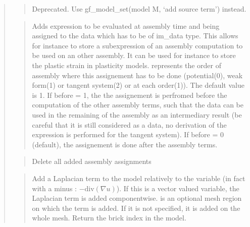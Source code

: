\documentclass[a4paper,11pt,english]{sphinxmanual}
\begin{document}
\begin{quote}
\sphinxAtStartPar
{}
\begin{quote}

\sphinxAtStartPar
Deprecated. Use gf\_model\_set(model M, ‘add source term’) instead.
\end{quote}

\sphinxAtStartPar
{}
\begin{quote}

\sphinxAtStartPar
Adds expression  to be evaluated at assembly time and being
assigned to the data  which has to be of im\_data type.
This allows for instance to store a sub\sphinxhyphen{}expression of an assembly
computation to be used on an other assembly. It can be used for instance
to store the plastic strain in plasticity models.
 represents the order of assembly where this assignement has to be
done (potential(0), weak form(1) or tangent system(2) or at each
order(\sphinxhyphen{}1)). The default value is 1.
If before = 1, the the assignement is perfromed before the computation
of the other assembly terms, such that the data can be used in the
remaining of the assembly as an intermediary result (be careful that it is
still considered as a data, no derivation of the expression is performed
for the tangent system).
If before = 0 (default), the assignement is done after the assembly terms.
\end{quote}

\sphinxAtStartPar
{}
\begin{quote}

\sphinxAtStartPar
Delete all added assembly assignments
\end{quote}

\sphinxAtStartPar
{}
\begin{quote}

\sphinxAtStartPar
Add a Laplacian term to the model relatively to the variable 
(in fact with a minus : \(-\text{div}(\nabla u)\)).
If this is a vector valued variable, the Laplacian term is added
componentwise.  is an optional mesh region on which the term
is added. If it is not specified, it is added on the whole mesh. Return
the brick index in the model.
\end{quote}


\end{quote}
\end{document}
